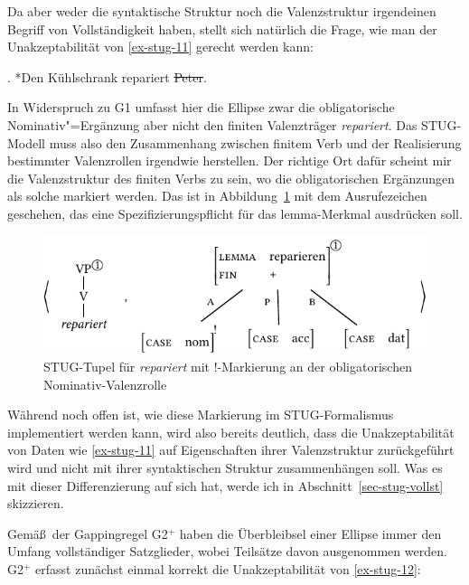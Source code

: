 Da aber weder die syntaktische Struktur noch die Valenzstruktur irgendeinen Begriff von Vollständigkeit haben, stellt sich natürlich die Frage, wie man der Unakzeptabilität von \ref{ex-stug-11} gerecht werden kann:

\ex. \label{ex-stug-11} *Den Kühlschrank repariert \sout{Peter}.

In Widerspruch zu G1 umfasst hier die Ellipse zwar die obligatorische Nominativ"=Ergänzung aber nicht den finiten Valenzträger {\it repariert}. Das STUG-Modell muss also den Zusammenhang zwischen finitem Verb und der Realisierung bestimmter Valenzrollen irgendwie herstellen. Der richtige Ort dafür scheint mir die Valenzstruktur des finiten Verbs zu sein, wo die obligatorischen Ergänzungen als solche markiert werden. Das ist in Abbildung~\ref{fig-stug-15} mit dem Ausrufezeichen geschehen, das eine Spezifizierungspflicht für das {\sc lemma}-Merkmal ausdrücken soll.
\begin{figure}[t]
\centering
\includegraphics{graphics/abb915.pdf}
\caption{\label{fig-stug-15}STUG-Tupel für {\it repariert} mit !-Markierung an der obligatorischen Nominativ-Valenzrolle}
\end{figure}
Während noch offen ist, wie diese Markierung im STUG-Formalismus implementiert werden kann, wird also bereits deutlich, dass die Unakzeptabilität von Daten wie \ref{ex-stug-11} auf Eigenschaften ihrer Valenzstruktur zurückgeführt wird und nicht mit ihrer syntaktischen Struktur zusammenhängen soll. Was es mit dieser Differenzierung auf sich hat, werde ich in Abschnitt~\ref{sec-stug-vollst} skizzieren. 

\label{sec-stug-g2}

Gemä\ss\ der Gappingregel G2$^+$ haben die Überbleibsel einer Ellipse immer den Umfang vollständiger Satzglieder, wobei Teilsätze davon ausgenommen werden. G2$^+$ erfasst zunächst einmal korrekt die Unakzeptabilität von \ref{ex-stug-12}: 

